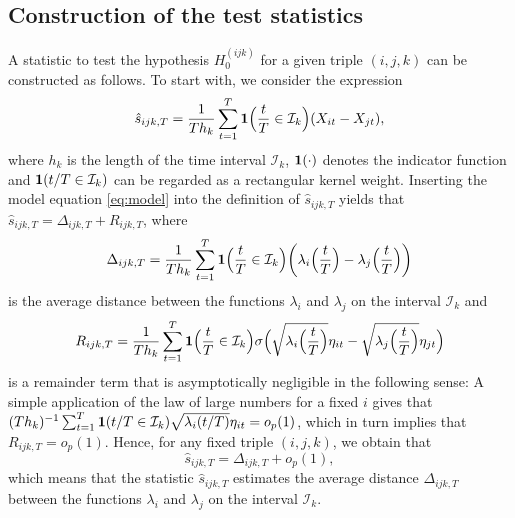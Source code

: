 \documentclass[a4paper,12pt]{article}
\numberwithin{equation}{section}
\begin{document}
{\color{red}
\subsection{Construction of the test statistics}\label{subsec:test:test}


A statistic to test the hypothesis $H_0^{(ijk)}$ for a given triple $(i,j,k)$ can be constructed as follows. To start with, we consider the expression 
\[ \hat{s}_{ijk,T} = \frac{1}{Th_k} \sum\limits_{t=1}^T \boldsymbol{1}\Big(\frac{t}{T} \in \mathcal{I}_k\Big) (X_{it} - X_{jt}), \]
where $h_k$ is the length of the time interval $\mathcal{I}_k$, $\boldsymbol{1}(\cdot)$ denotes the indicator function and $\boldsymbol{1}(t/T \in \mathcal{I}_k)$ can be regarded as a rectangular kernel weight. Inserting the model equation \eqref{eq:model} into the definition of $\hat{s}_{ijk,T}$ yields that $\hat{s}_{ijk,T} = \Delta_{ijk,T} + R_{ijk,T}$, where 
\begin{equation*}
\Delta_{ijk,T} = \frac{1}{Th_k} \sum\limits_{t=1}^T \boldsymbol{1}\Big(\frac{t}{T} \in \mathcal{I}_k\Big) \bigg( \lambda_i \Big(\frac{t}{T}\Big)  - \lambda_j \Big(\frac{t}{T}\Big)\bigg) 
\end{equation*}
is the average distance between the functions $\lambda_i$ and $\lambda_j$ on the interval $\mathcal{I}_k$ and 
\begin{equation*}
R_{ijk,T} = \frac{1}{Th_k} \sum\limits_{t=1}^T \boldsymbol{1}\Big(\frac{t}{T} \in \mathcal{I}_k\Big) \sigma \Big( \sqrt{ \lambda_i\Big(\frac{t}{T}\Big)} \eta_{it} - \sqrt{ \lambda_j\Big(\frac{t}{T}\Big)} \eta_{jt} \Big) 
\end{equation*}
is a remainder term that is asymptotically negligible in the following sense: A simple application of the law of large numbers for a fixed $i$ gives that $(Th_k)^{-1} \sum_{t=1}^T \boldsymbol{1}(t/T \in \mathcal{I}_k) \sqrt{\lambda_i(t/T)} \eta_{it} = o_p(1)$, which in turn implies that $R_{ijk,T} = o_p(1)$.
Hence, for any fixed triple $(i,j,k)$, we obtain that 
\[ \hat{s}_{ijk,T} = \Delta_{ijk,T} + o_p(1), \]
which means that the statistic $\hat{s}_{ijk,T}$ estimates the average distance $\Delta_{ijk,T}$ between the functions $\lambda_i$ and $\lambda_j$ on the interval $\mathcal{I}_k$. 


}
\end{document}
